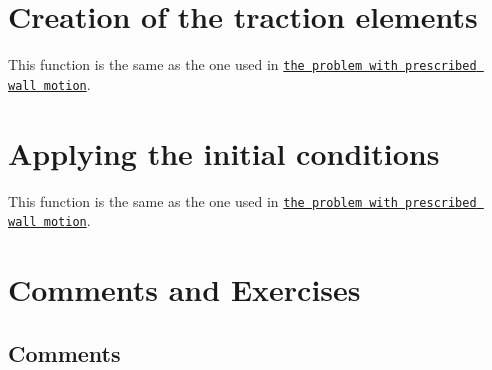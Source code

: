  

\hypertarget{index_tractioncre}{}\section{Creation of the traction elements}\label{index_tractioncre}
This function is the same as the one used in \href{../../../navier_stokes/collapsible_channel/html/index.html}{\tt the problem with prescribed wall motion}.



 

\hypertarget{index_IC}{}\section{Applying the initial conditions}\label{index_IC}
This function is the same as the one used in \href{../../../navier_stokes/collapsible_channel/html/index.html}{\tt the problem with prescribed wall motion}.



 

 \hypertarget{index_comments_and_ex}{}\section{Comments and Exercises}\label{index_comments_and_ex}
\hypertarget{index_comments}{}\subsection{Comments}\label{index_comments}

